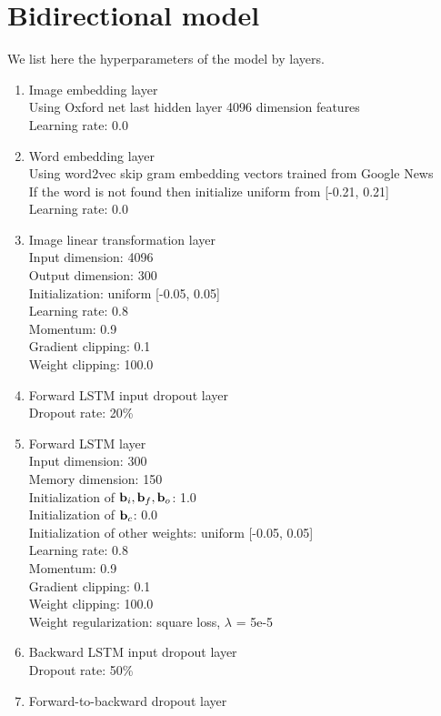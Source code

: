\section{Bidirectional model}
\label{sec:bimgword}
We list here the hyperparameters of the model by layers.
\begin{enumerate}
\item Image embedding layer\\
Using Oxford net \cite{simonyan14} last hidden layer 4096 dimension features\\
Learning rate: 0.0
\item Word embedding layer\\
Using word2vec skip gram embedding vectors trained from Google News \cite{mikolov13}\\
If the word is not found then initialize uniform from [-0.21, 0.21]\\
Learning rate: 0.0
\item Image linear transformation layer\\
Input dimension: 4096\\
Output dimension: 300\\
Initialization: uniform [-0.05, 0.05]\\
Learning rate: 0.8\\
Momentum: 0.9\\
Gradient clipping: 0.1\\
Weight clipping: 100.0
\item Forward LSTM input dropout layer\\
Dropout rate: 20\%
\item Forward LSTM layer\\
Input dimension: 300\\
Memory dimension: 150\\
Initialization of $\mathbf{b}_i, \mathbf{b}_f, \mathbf{b}_o$: 1.0\\
Initialization of $\mathbf{b}_c$: 0.0\\
Initialization of other weights: uniform [-0.05, 0.05]\\
Learning rate: 0.8\\
Momentum: 0.9\\
Gradient clipping: 0.1\\
Weight clipping: 100.0\\
Weight regularization: square loss, $\lambda$ = 5e-5
\item Backward LSTM input dropout layer\\
Dropout rate: 50\%
\item Forward-to-backward dropout layer\\

\end{enumerate}
